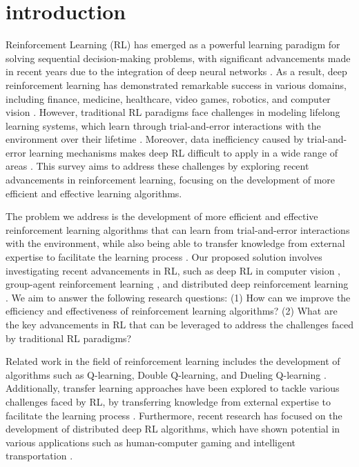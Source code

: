 \section{introduction}
Reinforcement Learning (RL) has emerged as a powerful learning paradigm for solving sequential decision-making problems, with significant advancements made in recent years due to the integration of deep neural networks \cite{2108.11510}. As a result, deep reinforcement learning has demonstrated remarkable success in various domains, including finance, medicine, healthcare, video games, robotics, and computer vision \cite{2108.11510}. However, traditional RL paradigms face challenges in modeling lifelong learning systems, which learn through trial-and-error interactions with the environment over their lifetime \cite{2001.09608}. Moreover, data inefficiency caused by trial-and-error learning mechanisms makes deep RL difficult to apply in a wide range of areas \cite{2212.00253}. This survey aims to address these challenges by exploring recent advancements in reinforcement learning, focusing on the development of more efficient and effective learning algorithms.

The problem we address is the development of more efficient and effective reinforcement learning algorithms that can learn from trial-and-error interactions with the environment, while also being able to transfer knowledge from external expertise to facilitate the learning process \cite{2009.07888}. Our proposed solution involves investigating recent advancements in RL, such as deep RL in computer vision \cite{2108.11510}, group-agent reinforcement learning \cite{2202.05135}, and distributed deep reinforcement learning \cite{2212.00253}. We aim to answer the following research questions: (1) How can we improve the efficiency and effectiveness of reinforcement learning algorithms? (2) What are the key advancements in RL that can be leveraged to address the challenges faced by traditional RL paradigms?

Related work in the field of reinforcement learning includes the development of algorithms such as Q-learning, Double Q-learning, and Dueling Q-learning \cite{2106.14642, 2106.01134, 2012.01100}. Additionally, transfer learning approaches have been explored to tackle various challenges faced by RL, by transferring knowledge from external expertise to facilitate the learning process \cite{2009.07888}. Furthermore, recent research has focused on the development of distributed deep RL algorithms, which have shown potential in various applications such as human-computer gaming and intelligent transportation \cite{2212.00253}.

